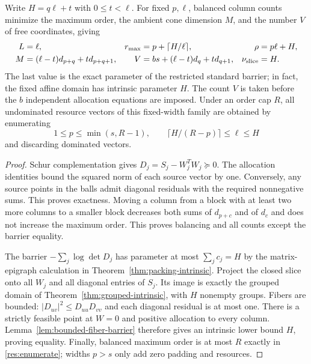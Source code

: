 \begin{proposition}\label{res:packing}
Write $H=q\ell+t$ with $0\leq t<\ell$. For fixed $p,\ell$, balanced column
counts minimize the maximum order, the ambient cone dimension $M$, and the
number $V$ of free coordinates, giving
\begin{align}
 L&=\ell,&r_{\max}&=p+\lceil H/\ell\rceil,&\rho&=p\ell+H,\nonumber\\
 M&=(\ell-t)d_{p+q}+td_{p+q+1},&
 V&=bs+(\ell-t)d_q+td_{q+1},&\nu_{\rm slice}&=H.
 \label{res:packing-ledger}
\end{align}
The last value is the exact parameter of the restricted standard barrier; in fact, the fixed affine domain has intrinsic parameter
$H$. The count $V$ is taken before the $b$ independent allocation
equations are imposed. Under an order cap $R$, all undominated resource
vectors of this fixed-width family are obtained by enumerating
\begin{equation}\label{res:enumerate}
 1\leq p\leq\min(s,R-1),\qquad
 \lceil H/(R-p)\rceil\leq\ell\leq H
\end{equation}
and discarding dominated vectors.
\end{proposition}
\begin{proof}
Schur complementation gives $D_j=S_j-W_j^TW_j\succeq0$.
The allocation identities bound the squared norm of each source vector
by one. Conversely, any source points in the balls admit diagonal residuals with
the required nonnegative sums. This proves exactness.
Moving a column from a block with at least two more columns to a smaller
block decreases both sums of $d_{p+c}$ and of $d_c$ and does not
increase the maximum order. This proves balancing and all counts except the barrier equality.

The barrier $-\sum_j\log\det D_j$ has parameter at most $\sum_jc_j=H$
by the matrix-epigraph calculation in Theorem~\ref{thm:packing-intrinsic}.
Project the closed slice onto all $W_j$ and all diagonal entries of $S_j$.
Its image is exactly the grouped domain of
Theorem~\ref{thm:grouped-intrinsic}, with $H$ nonempty groups. Fibers are
bounded: $|D_{uv}|^2\leq D_{uu}D_{vv}$ and each diagonal residual is at
most one. There is a strictly feasible point at $W=0$ and positive
allocation to every column. Lemma~\ref{lem:bounded-fiber-barrier}
therefore gives an intrinsic lower bound $H$, proving equality.
Finally, balanced maximum order is at most $R$ exactly in
\eqref{res:enumerate}; widths $p>s$ only add zero padding and resources.
\end{proof}

